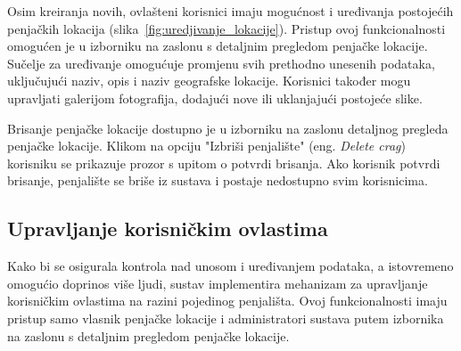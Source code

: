 Osim kreiranja novih, ovlašteni korisnici imaju mogućnost i uređivanja postojećih penjačkih lokacija (slika~\ref{fig:uredjivanje_lokacije}). Pristup ovoj funkcionalnosti omogućen je u izborniku na zaslonu s detaljnim pregledom penjačke lokacije. 
Sučelje za uređivanje omogućuje promjenu svih prethodno unesenih podataka, uključujući naziv, opis i naziv geografske lokacije. Korisnici također mogu upravljati galerijom fotografija, dodajući nove ili uklanjajući postojeće slike. 

Brisanje penjačke lokacije dostupno je u izborniku na zaslonu detaljnog pregleda penjačke lokacije. Klikom na opciju "Izbriši penjalište" (eng. \textit{Delete crag}) korisniku se prikazuje prozor s upitom o potvrdi brisanja. Ako korisnik potvrdi brisanje, penjalište se briše iz sustava i postaje nedostupno svim korisnicima.

\subsection{Upravljanje korisničkim ovlastima}

Kako bi se osigurala kontrola nad unosom i uređivanjem podataka, a istovremeno omogućio doprinos više ljudi, sustav implementira mehanizam za upravljanje korisničkim ovlastima na razini pojedinog penjališta. Ovoj funkcionalnosti imaju pristup samo vlasnik penjačke lokacije i administratori sustava putem izbornika na zaslonu s detaljnim pregledom penjačke lokacije. 

